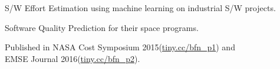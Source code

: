 \documentclass[]{bigfatnoob-resume}
\begin{document}
\begin{minipage}[t]{0.66\textwidth}
\descript{}
\begin{tightemize}
\item S/W Effort Estimation using machine learning on industrial S/W projects.
\item Software Quality Prediction for their space programs.
\item Published in NASA Cost Symposium 2015(\href{https://tiny.cc/bfn_p1}{tiny.cc/bfn\_p1}) and\\ EMSE Journal 2016(\href{https://tiny.cc/bfn\_p2}{tiny.cc/bfn\_p2}).
\end{tightemize}
\sectionsep


\sectionsep

\end{minipage} 
\end{document}
